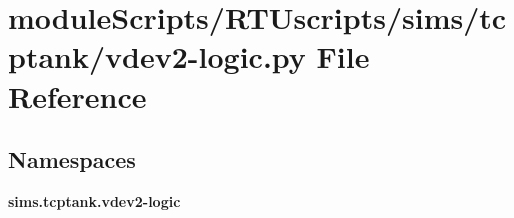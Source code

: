 \section{module\+Scripts/\+R\+T\+Uscripts/sims/tcptank/vdev2-\/logic.py File Reference}
\label{vdev2-logic_8py}
\subsection*{Namespaces}
\begin{DoxyCompactItemize}
\item 
 {\bf sims.\+tcptank.\+vdev2-\/logic}
\end{DoxyCompactItemize}

